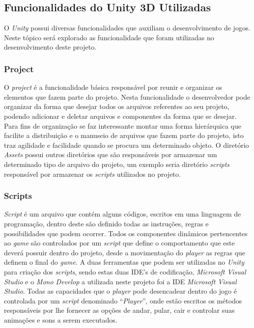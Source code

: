 \documentclass[
	12pt,				%
    oneside,			%
	a4paper,			%
	english,			%
	french,				%
	spanish,			%
	brazil,				%
	]{abntex2}
\begin{document}
		\subsection{Funcionalidades do Unity 3D Utilizadas}
			O \textit{Unity} possui diversas funcionalidades que auxiliam o desenvolvimento de jogos. Neste tópico será explorado as funcionalidade que foram utilizadas no desenvolvimento deste projeto.
			
			\subsubsection{Project}
				O \textit{project} é a funcionalidade básica responsável por reunir e organizar os elementos que fazem parte do projeto. Nesta funcionalidade o desenvolvedor pode organizar da forma que desejar todos os arquivos referentes ao seu projeto, podendo adicionar e deletar arquivos e componentes da forma que se desejar. Para fins de organização se faz interessante montar uma forma hierárquica que facilite a distribuição e o manuseio de arquivos que fazem parte do projeto, isto traz agilidade e facilidade quando se procura um determinado objeto. O diretório \textit{Assets} possui outros diretórios que são responsáveis por armazenar um determinado tipo de arquivo do projeto, um exemplo seria diretório \textit{scripts} responsável por armazenar os \textit{scripts} utilizados no projeto.  
				
				
			\subsubsection{Scripts}
				\textit{Script} é um arquivo que contém alguns códigos, escritos em uma linguagem de programação, dentro deste são definido todas as instruções, regras e possibilidades que podem ocorrer. Todos os componentes dinâmicos pertencentes ao \textit{game} são controlados por um \textit{script} que define o comportamento que este deverá possuir dentro do projeto, desde a movimentação do \textit{player} as regras que definem o final do \textit{game}. A duas ferramentas que podem ser utilizadas no \textit{Unity} para criação dos \textit{scripts}, sendo estas duas IDE’s de codificação, \textit{Microsoft Visual Studio} e o \textit{Mono Develop} a utilizada neste projeto foi a IDE \textit{Microsoft Visual Studio}.
				Todas as capacidades que o \textit{player} pode desencadear dentro do jogo é controlada por um \textit{script} denominado “\textit{Player}”, onde estão escritos os métodos responsáveis por lhe fornecer as opções de andar, pular, cair e controlar suas animações e sons a serem executados.
				
\end{document}
